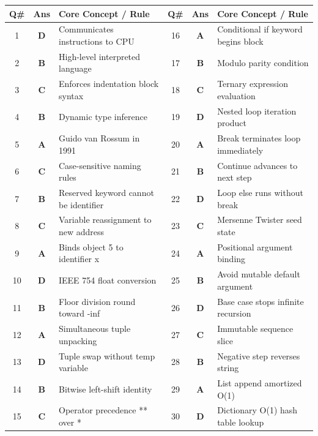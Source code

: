 \begin{center}
\begin{tabularx}{0.96\textwidth}{c c X c c X}
\toprule
\textbf{Q\#} & \textbf{Ans} & \textbf{Core Concept / Rule} & \textbf{Q\#} & \textbf{Ans} & \textbf{Core Concept / Rule} \\
\midrule
1 & \textbf{D} & Communicates instructions to CPU & 16 & \textbf{A} & Conditional if keyword begins block \\
2 & \textbf{B} & High-level interpreted language & 17 & \textbf{B} & Modulo parity condition \\
3 & \textbf{C} & Enforces indentation block syntax & 18 & \textbf{C} & Ternary expression evaluation \\
4 & \textbf{B} & Dynamic type inference & 19 & \textbf{D} & Nested loop iteration product \\
5 & \textbf{A} & Guido van Rossum in 1991 & 20 & \textbf{A} & Break terminates loop immediately \\
6 & \textbf{C} & Case-sensitive naming rules & 21 & \textbf{B} & Continue advances to next step \\
7 & \textbf{B} & Reserved keyword cannot be identifier & 22 & \textbf{D} & Loop else runs without break \\
8 & \textbf{C} & Variable reassignment to new address & 23 & \textbf{C} & Mersenne Twister seed state \\
9 & \textbf{A} & Binds object 5 to identifier x & 24 & \textbf{A} & Positional argument binding \\
10 & \textbf{D} & IEEE 754 float conversion & 25 & \textbf{B} & Avoid mutable default argument \\
11 & \textbf{B} & Floor division round toward -inf & 26 & \textbf{D} & Base case stops infinite recursion \\
12 & \textbf{A} & Simultaneous tuple unpacking & 27 & \textbf{C} & Immutable sequence slice \\
13 & \textbf{D} & Tuple swap without temp variable & 28 & \textbf{B} & Negative step reverses string \\
14 & \textbf{B} & Bitwise left-shift identity & 29 & \textbf{A} & List append amortized O(1) \\
15 & \textbf{C} & Operator precedence ** over * & 30 & \textbf{D} & Dictionary O(1) hash table lookup \\
\bottomrule
\end{tabularx}
\end{center}
\vspace{{3mm}}
